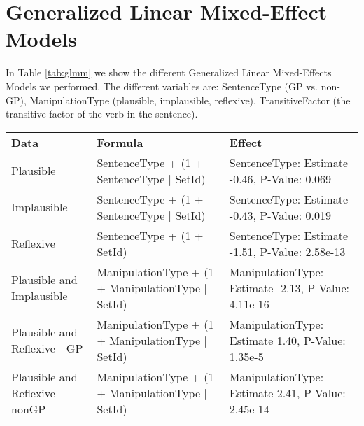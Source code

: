 \section{Generalized Linear Mixed-Effect Models}
\label{sec:glmm_app}

In Table \ref{tab:glmm} we show the different Generalized Linear Mixed-Effects Models we performed. The different variables are: SentenceType (GP vs. non-GP), ManipulationType (plausible, implausible, reflexive), TransitiveFactor (the transitive factor of the verb in the sentence).

\begin{table*}[t!]
    \scriptsize 
    \centering
        \begin{tabular}{ l | l | l }
         \textbf{Data} & \textbf{Formula} & \textbf{Effect} \\
        \thickhline
        Plausible & SentenceType + (1 + SentenceType | SetId) & SentenceType: Estimate -0.46, P-Value: 0.069 \\
        Implausible & SentenceType + (1 + SentenceType | SetId) & SentenceType: Estimate -0.43, P-Value: 0.019 \\
        Reflexive & SentenceType + (1 + SetId) & SentenceType: Estimate -1.51, P-Value: 2.58e-13 \\
        Plausible and Implausible & ManipulationType + (1 + ManipulationType | SetId) & ManipulationType: Estimate -2.13, P-Value: 4.11e-16 \\
        Plausible and Reflexive - GP & ManipulationType + (1 + ManipulationType | SetId) & ManipulationType: Estimate 1.40, P-Value: 1.35e-5 \\
        Plausible and Reflexive - nonGP & ManipulationType + (1 + ManipulationType | SetId) & ManipulationType: Estimate 2.41, P-Value: 2.45e-14 \\
        \end{tabular}
        \vspace{-0.2cm}
    \caption{Details about the Generalized Linear Mixed-Effects Models we performed}
    \label{tab:glmm}
\end{table*}

